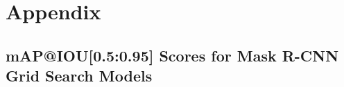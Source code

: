\renewcommand{\thesection}{\Alph{section}} %
\renewcommand{\thesubsection}{\Alph{subsection}} %


\titleformat{\chapter}[display]
{\normalfont\huge\bfseries}{\chaptertitlename\ \thechapter}{20pt}{\Huge} %

\titlespacing*{\chapter}{0pt}{0pt}{20pt}
\chapter{Appendix} 
\titlespacing*{\chapter}{0pt}{50pt}{40pt}

\setcounter{section}{0} %
\setcounter{table}{0}
\renewcommand{\thetable}{\Alph{section}}
\renewcommand{\theHtable}{Tab.\arabic{table}}%
\renewcommand{\theHfigure}{Fig.\arabic{figure}}%


\section{mAP@IOU[0.5:0.95] Scores for Mask R-CNN Grid Search Models}\label{app:mAPScoresGridSearch}

